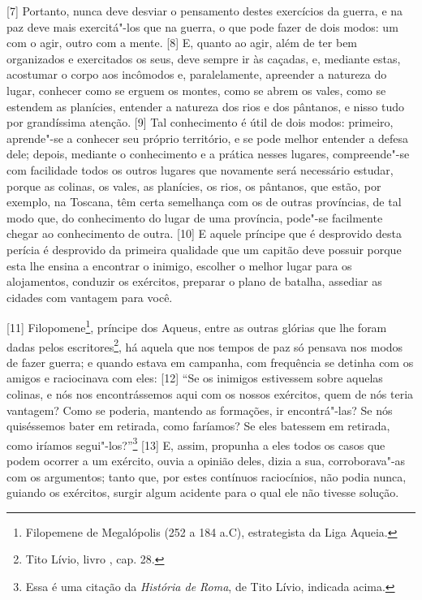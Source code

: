 {[}7{]} Portanto, nunca deve desviar o pensamento destes exercícios da
guerra, e na paz deve mais exercitá"-los que na guerra, o que pode fazer
de dois modos: um com o agir, outro com a mente. {[}8{]} E, quanto ao
agir, além de ter bem organizados e exercitados os seus, deve sempre ir
às caçadas, e, mediante estas, acostumar o corpo aos incômodos e,
paralelamente, apreender a natureza do lugar, conhecer como se erguem os
montes, como se abrem os vales, como se estendem as planícies, entender
a natureza dos rios e dos pântanos, e nisso tudo por grandíssima
atenção. {[}9{]} Tal conhecimento é útil de dois modos: primeiro,
aprende"-se a conhecer seu próprio território, e se pode melhor entender
a defesa dele; depois, mediante o conhecimento e a prática nesses
lugares, compreende"-se com facilidade todos os outros lugares que
novamente será necessário estudar, porque as colinas, os vales, as
planícies, os rios, os pântanos, que estão, por exemplo, na Toscana, têm
certa semelhança com os de outras províncias, de tal modo que, do
conhecimento do lugar de uma província, pode"-se facilmente chegar ao
conhecimento de outra. {[}10{]} E aquele príncipe que é desprovido desta
perícia é desprovido da primeira qualidade que um capitão deve possuir
porque esta lhe ensina a encontrar o inimigo, escolher o melhor lugar
para os alojamentos, conduzir os exércitos, preparar o plano de batalha,
assediar as cidades com vantagem para você.

{[}11{]} Filopomene\footnote{Filopemene de Megalópolis (252 a 184 a.C),
  estrategista da Liga Aqueia.}, príncipe dos Aqueus, entre as outras
glórias que lhe foram dadas pelos escritores\footnote{Tito Lívio, livro
  , cap. 28.}, há aquela que nos tempos de paz só pensava nos modos
de fazer guerra; e quando estava em campanha, com frequência se detinha
com os amigos e raciocinava com eles: {[}12{]} ``Se os inimigos
estivessem sobre aquelas colinas, e nós nos encontrássemos aqui com os
nossos exércitos, quem de nós teria vantagem? Como se poderia, mantendo
as formações, ir encontrá"-las? Se nós quiséssemos bater em retirada,
como faríamos? Se eles batessem em retirada, como iríamos
segui"-los?''\footnote{Essa é uma citação da \emph{História de Roma}, de
  Tito Lívio, indicada acima.} {[}13{]} E, assim, propunha a eles todos
os casos que podem ocorrer a um exército, ouvia a opinião deles, dizia a
sua, corroborava"-as com os argumentos; tanto que, por estes contínuos
raciocínios, não podia nunca, guiando os exércitos, surgir algum
acidente para o qual ele não tivesse solução.

